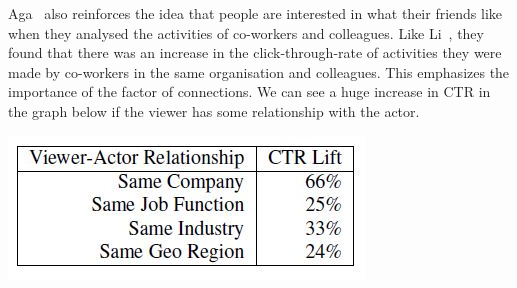 Aga~\cite{Aga2014} also reinforces the idea that people are interested in what their friends like when they analysed the activities of co-workers and colleagues. Like Li~\cite{LiTiaLee2010}, they found that there was an increase in the click-through-rate of activities they were made by co-workers in the same organisation and colleagues. This emphasizes the importance of the factor of connections. We can see a huge increase in CTR in the graph below if the viewer has some relationship with the actor.

\begin{center}
  \includegraphics[scale=0.8]{images/connections.jpg}
\end{center}